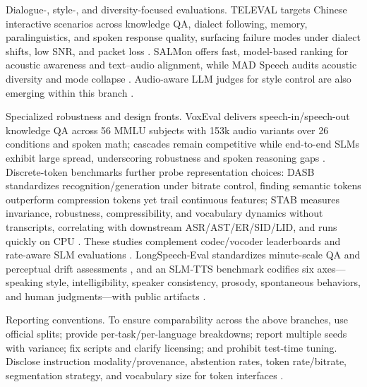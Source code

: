 Dialogue-, style-, and diversity-focused evaluations. TELEVAL targets Chinese interactive scenarios across knowledge QA, dialect following, memory, paralinguistics, and spoken response quality, surfacing failure modes under dialect shifts, low SNR, and packet loss \cite{li2025televaldynamicbenchmarkdesignedspokenlan}. SALMon offers fast, model-based ranking for acoustic awareness and text–audio alignment, while MAD Speech audits acoustic diversity and mode collapse \cite{maimon2025salmonsuiteacousticlanguagemodelevaluati,futeral2025madspeechmeasuresacousticdiversity}. Audio-aware LLM judges for style control are also emerging within this branch \cite{chiang2025audioawarelargelanguagemodelsasjudgesspe}.

Specialized robustness and design fronts. VoxEval delivers speech-in/speech-out knowledge QA across 56 MMLU subjects with 153k audio variants over 26 conditions and spoken math; cascades remain competitive while end-to-end SLMs exhibit large spread, underscoring robustness and spoken reasoning gaps \cite{cui2025voxevalbenchmarkingknowledgeunderstandin}. Discrete-token benchmarks further probe representation choices: DASB standardizes recognition/generation under bitrate control, finding semantic tokens outperform compression tokens yet trail continuous features; STAB measures invariance, robustness, compressibility, and vocabulary dynamics without transcripts, correlating with downstream ASR/AST/ER/SID/LID, and runs quickly on CPU \cite{mousavi2024dasbdiscreteaudiospeechbenchmark,vashishth2024stabspeechtokenizerassessmentbenchmark}. These studies complement codec/vocoder leaderboards and rate-aware SLM evaluations \cite{guo2025recentadvancesdiscretespeechtokensreview}. LongSpeech‑Eval standardizes minute-scale QA and perceptual drift assessments \cite{park2025longformspeechgenerationspokenlanguagemo}, and an SLM‑TTS benchmark codifies six axes—speaking style, intelligibility, speaker consistency, prosody, spontaneous behaviors, and human judgments—with public artifacts \cite{wang2024evaluatingtextspeechsynthesislargediscre}.

Reporting conventions. To ensure comparability across the above branches, use official splits; provide per-task/per-language breakdowns; report multiple seeds with variance; fix scripts and clarify licensing; and prohibit test-time tuning. Disclose instruction modality/provenance, abstention rates, token rate/bitrate, segmentation strategy, and vocabulary size for token interfaces \cite{vashishth2024stabspeechtokenizerassessmentbenchmark,entry2025indicsuperbspeechprocessinguniversalperf,noroozi2024instructiondatagenerationunsupervisedada}.




